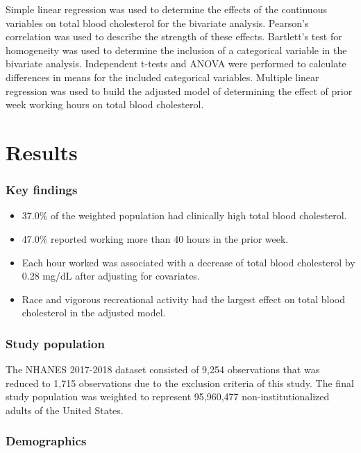 \documentclass[]{elsarticle} %
\providecommand{\tightlist}{%
  \setlength{\itemsep}{0pt}\setlength{\parskip}{0pt}}
\begin{document}
Simple linear regression was used to determine the effects of the
continuous variables on total blood cholesterol for the bivariate
analysis. Pearson's correlation was used to describe the strength of
these effects. Bartlett's test for homogeneity was used to determine the
inclusion of a categorical variable in the bivariate analysis.
Independent t-tests and ANOVA were performed to calculate differences in
means for the included categorical variables. Multiple linear regression
was used to build the adjusted model of determining the effect of prior
week working hours on total blood cholesterol.

\hypertarget{results}{%
\section{Results}\label{results}}

\hypertarget{key-findings}{%
\subsubsection{Key findings}\label{key-findings}}

\begin{itemize}
\tightlist
\item
  37.0\% of the weighted population had clinically high total blood
  cholesterol.
\item
  47.0\% reported working more than 40 hours in the prior week.
\item
  Each hour worked was associated with a decrease of total blood
  cholesterol by 0.28 mg/dL after adjusting for covariates.
\item
  Race and vigorous recreational activity had the largest effect on
  total blood cholesterol in the adjusted model.
\end{itemize}

\hypertarget{study-population-1}{%
\subsubsection{Study population}\label{study-population-1}}

The NHANES 2017-2018 dataset consisted of 9,254 observations that was
reduced to 1,715 observations due to the exclusion criteria of this
study. The final study population was weighted to represent 95,960,477
non-institutionalized adults of the United States.

\hypertarget{demographics}{%
\subsubsection{Demographics}\label{demographics}}
\end{document}
